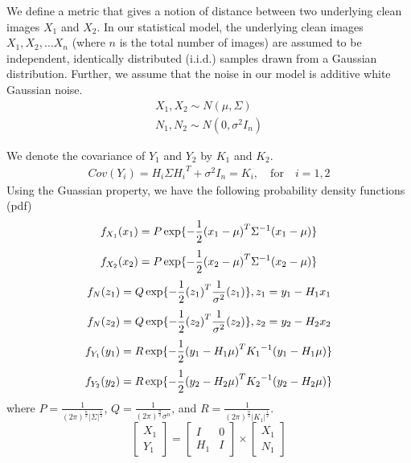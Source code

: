 \documentclass{article}
\begin{document}
We define a metric that gives a notion of distance between two underlying clean images $X_1$ and $X_2$. In our statistical model, the underlying clean images $X_1, X_2, \ldots X_n$ (where $n$ is the total number of images) are assumed to be independent, identically distributed (i.i.d.) samples drawn from a Gaussian distribution. Further, we assume that the noise in our model is additive white Gaussian noise.
\begin{eqnarray} 
X_1, X_2  \sim N( {\mu},\Sigma) \nonumber \\ 
N_1, N_2  \sim N(0,{\sigma}^2 I_n )
\end{eqnarray}

We denote the covariance of $Y_1$ and $Y_2$ by $K_1$ and $K_2$.
\begin{eqnarray}
Cov(Y_i) = H_i \Sigma {H_i}^T + {\sigma}^2 I_n = K_i , \quad \text{for} \quad i=1,2 
\end{eqnarray}
Using the Guassian property, we have the following probability density functions (pdf)
\begin{equation}
\small{
f_{X_1}(x_1) = P \exp\{-\frac{1}{2}{(x_1-\mu)}^T {\Sigma}^{-1}(x_1-\mu)\} }
\end{equation}
\begin{equation}
\small{f_{X_2}(x_2) = P \exp\{-\frac{1}{2}{(x_2-\mu)}^T {\Sigma}^{-1}(x_2-\mu)\} }
\end{equation}
\begin{equation}
\small{f_N(z_1) = Q \exp\{-\frac{1}{2}{(z_1)}^T \frac{1}{\sigma^2}(z_1)\}, z_1=y_1-H_1 x_1}
\end{equation}
\begin{equation}
\small{f_N(z_2) = Q \exp\{-\frac{1}{2}{(z_2)}^T \frac{1}{\sigma^2} (z_2)\}, z_2=y_2-H_2 x_2}
\end{equation}
\begin{equation}
\small{f_{Y_1}(y_1) = R \exp\{-\frac{1}{2}{(y_1-H_1\mu)}^T {K_1}^{-1}(y_1-H_1\mu)\}}
\end{equation}
\begin{equation}
\small{f_{Y_2}(y_2) = R \exp\{-\frac{1}{2}{(y_2-H_2\mu)}^T {K_2}^{-1}(y_2-H_2\mu)\}}
\end{equation}
where $P=\frac{1}{({2\pi})^{\frac{n}{2}}{|\Sigma|}^{\frac{1}{2}}}$, $Q=\frac{1}{({2\pi})^{\frac{n}{2}}\sigma^n}$, and $R=\frac{1}{({2\pi})^{\frac{n}{2}} {|K_1|}^{\frac{1}{2}}}$.
\begin{equation}
 \left[\begin{array}{c} X_1 \\ Y_1 \end{array}\right] = 
\begin{bmatrix} I & 0 \\ H_1 & I \end{bmatrix} \times \left[ \begin{array}{c} X_1 \\ N_1 \end{array} \right]      
\end{equation}
\end{document}
